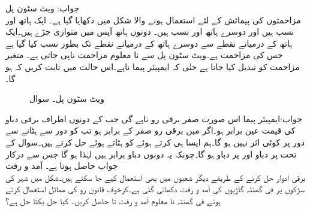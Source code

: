 جواب:
\quad ویٹ سٹون پل\\
مزاحمتوں کی پیمائش کے لئے استعمال ہونے والا  شکل میں دکھایا گیا ہے۔ ایک ہاتھ   اور  نسب ہیں اور دوسرے ہاتھ  اور  نسب ہیں۔ دونوں ہاتھ آپس میں متوازی جڑے ہیں۔ایک ہاتھ کے درمیانے نقطے سے دوسرے ہاتھ کے درمیانے نقطے تک   بطور  نسب کیا گیا ہے جس کی مزاحمت  ہے۔ویٹ سٹون پل سے نا معلوم مزاحمت  ناپی جاتی ہے۔ متغیر مزاحمت  کو تبدیل کیا جاتا ہے حتٰی کہ  ایمپیئر پیما  ناپے۔اس حالت میں ثابت کریں کہ  ہو گا۔  
\begin{figure}
\centering
{}
\caption{ویٹ سٹون پل۔ سوال }
\label{شکل_سوال_الجبرا_ویٹ_سٹون_پل}
\end{figure}
جواب:ایمپیئر پیما اس صورت صفر برقی رو ناپے گی جب  کے دونوں اطراف برقی دباو کی قیمت عین برابر ہو۔اگر  میں برقی رو صفر کے برابر ہو تب  کو دور سے ہٹانے سے دور پر کوئی اثر نہیں ہو گا۔ہم ایسا ہی کرتے ہوئے  کو ہٹاتے ہوئے حل کرتے ہیں۔سوال  کے تحت  پر دباو  اور  پر دباو  ہو گا۔چونکہ یہ دونوں دباو برابر ہیں لہٰذا  ہو گا جس سے درکار جواب حاصل ہوتا ہے۔
\quad آمد و رفت\\
برقی ادوار حل کرنے کے طریقے دیگر شعبوں میں بھی استعمال کیے جا سکتے ہیں۔شکل  میں شہر کی سڑکوں پر فی گھنٹہ گاڑیوں کی آمد و رفت دکھائی گئی ہے۔کرخوف قانون رو کی مماثل استعمال کرتے ہوئے فی گھنٹہ نا معلوم آمد و رفت  تا  حاصل کریں۔ کیا حل یکتا حل ہے؟ 
